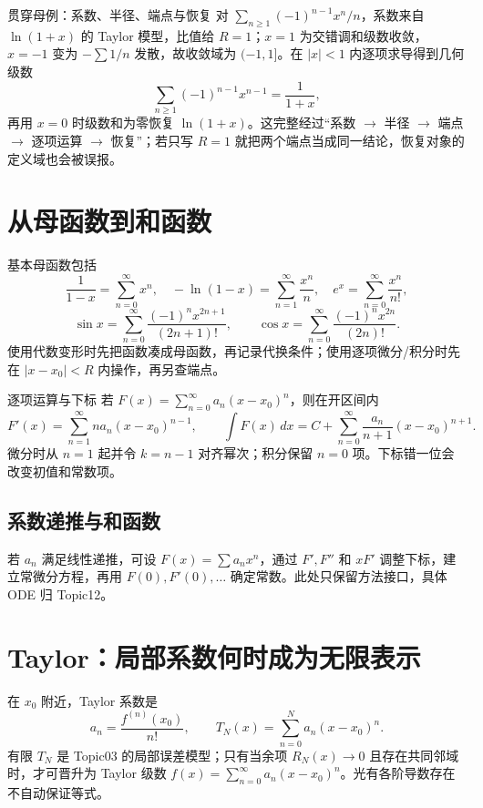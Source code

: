 \documentclass[11pt,a4paper,fontset=fandol]{ctexart}
\begin{document}
\begin{examplebox}{贯穿母例：系数、半径、端点与恢复}
对 $\sum_{n\ge1}(-1)^{n-1}x^n/n$，系数来自 $\ln(1+x)$ 的 Taylor 模型，比值给 $R=1$；$x=1$ 为交错调和级数收敛，$x=-1$ 变为 $-\sum1/n$ 发散，故收敛域为 $(-1,1]$。在 $\lvert x\rvert<1$ 内逐项求导得到几何级数
\[
\sum_{n\ge1}(-1)^{n-1}x^{n-1}=\frac1{1+x},
\]
再用 $x=0$ 时级数和为零恢复 $\ln(1+x)$。这完整经过“系数 $\to$ 半径 $\to$ 端点 $\to$ 逐项运算 $\to$ 恢复”；若只写 $R=1$ 就把两个端点当成同一结论，恢复对象的定义域也会被误报。
\end{examplebox}

\section{从母函数到和函数}
基本母函数包括
\[
\frac1{1-x}=\sum_{n=0}^{\infty}x^n,\quad
-\ln(1-x)=\sum_{n=1}^{\infty}\frac{x^n}{n},\quad
e^x=\sum_{n=0}^{\infty}\frac{x^n}{n!},
\]
\[
\sin x=\sum_{n=0}^{\infty}\frac{(-1)^nx^{2n+1}}{(2n+1)!},\qquad
\cos x=\sum_{n=0}^{\infty}\frac{(-1)^nx^{2n}}{(2n)!}.
\]
使用代数变形时先把函数凑成母函数，再记录代换条件；使用逐项微分/积分时先在 $\lvert x-x_0\rvert<R$ 内操作，再另查端点。

\begin{methodbox}{逐项运算与下标}
若 $F(x)=\sum_{n=0}^{\infty}a_n(x-x_0)^n$，则在开区间内
\[
F'(x)=\sum_{n=1}^{\infty}na_n(x-x_0)^{n-1},\qquad
\int F(x)\,dx=C+\sum_{n=0}^{\infty}\frac{a_n}{n+1}(x-x_0)^{n+1}.
\]
微分时从 $n=1$ 起并令 $k=n-1$ 对齐幂次；积分保留 $n=0$ 项。下标错一位会改变初值和常数项。
\end{methodbox}

\subsection{系数递推与和函数}
若 $a_n$ 满足线性递推，可设 $F(x)=\sum a_nx^n$，通过 $F',F''$ 和 $xF'$ 调整下标，建立常微分方程，再用 $F(0),F'(0),\ldots$ 确定常数。此处只保留方法接口，具体 ODE 归 Topic12。

\section{Taylor：局部系数何时成为无限表示}
在 $x_0$ 附近，Taylor 系数是
\[
a_n=\frac{f^{(n)}(x_0)}{n!},\qquad
T_N(x)=\sum_{n=0}^{N}a_n(x-x_0)^n.
\]
有限 $T_N$ 是 Topic03 的局部误差模型；只有当余项 $R_N(x)\to0$ 且存在共同邻域时，才可晋升为 Taylor 级数 $f(x)=\sum_{n=0}^{\infty}a_n(x-x_0)^n$。光有各阶导数存在不自动保证等式。
\end{document}
